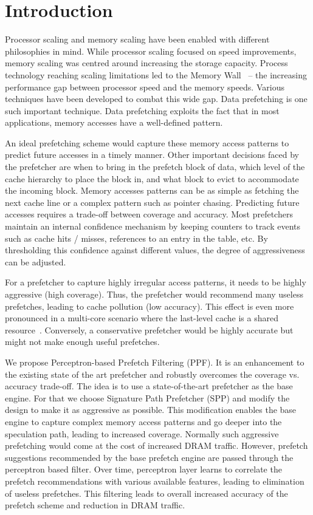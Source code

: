 \section{Introduction}
\label{Introduction}
Processor scaling and memory scaling have been enabled with different
philosophies in mind.  While processor scaling focused on speed improvements,
memory scaling was centred around increasing the storage capacity.  Process
technology reaching scaling limitations led to the Memory Wall~\cite{MemWall}
-- the increasing performance gap between processor speed and the memory
speeds.  Various techniques have been developed to combat this wide gap. Data
prefetching is one such important technique. Data prefetching exploits the
fact that in most applications, memory accesses have a well-defined pattern.

An ideal prefetching scheme would capture these memory access patterns to
predict future accesses in a timely manner.  Other important decisions faced
by the prefetcher are when to bring in the prefetch block of data, which level
of the cache hierarchy to place the block in, and what block to evict to
accommodate the incoming block.  Memory accesses patterns can be as simple as
fetching the next cache line or a complex pattern such as pointer chasing.
Predicting future accesses requires a trade-off between coverage and accuracy.
Most prefetchers maintain an internal confidence mechanism by keeping counters
to track events such as cache hits / misses, references to an entry in the
table, etc. By thresholding this confidence against different values, the
degree of aggressiveness can be adjusted.

For a prefetcher to capture highly irregular access patterns, it needs to be
highly aggressive (high coverage).  Thus, the prefetcher would recommend many
useless prefetches, leading to cache pollution (low accuracy).  This effect is
even more pronounced in a multi-core scenario where the last-level cache is a
shared resource~\cite{Friendly}.  Conversely, a conservative prefetcher would
be highly accurate but might not make enough useful prefetches.

We propose Perceptron-based Prefetch Filtering (PPF).  It is an enhancement to
the existing state of the art prefetcher and robustly overcomes the coverage
vs.  accuracy trade-off.  The idea is to use a state-of-the-art prefetcher as
the base engine.  For that we choose Signature Path Prefetcher (SPP) and
modify the design to make it as aggressive as possible.  This modification
enables the base engine to capture complex memory access patterns and go
deeper into the speculation path, leading to increased coverage. Normally such
aggressive prefetching would come at the cost of increased DRAM traffic.
However, prefetch suggestions recommended by the base prefetch engine are
passed through the perceptron based filter.  Over time, perceptron layer
learns to correlate the prefetch recommendations with various available
features, leading to elimination of useless prefetches. This filtering leads
to overall increased accuracy of the prefetch scheme and reduction in DRAM
traffic.

